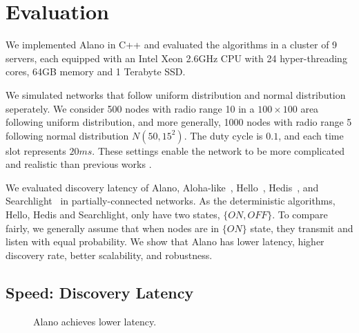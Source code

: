 \section{Evaluation}
\label{Evaluation}


We implemented Alano in C++ and evaluated the algorithms in a cluster of 9 servers, 
each equipped with an Intel Xeon 2.6GHz CPU with 24 hyper-threading cores, 64GB memory and 1 Terabyte SSD. 

We simulated networks that follow uniform distribution and normal distribution seperately. 
We consider 500 nodes with radio range 10 in a $100\times100$ area following uniform distribution, 
and more generally, 1000 nodes with radio range 5 following normal distribution $N(50, 15^2)$. 
The duty cycle is $0.1$, and each time slot represents $20ms$. 
These settings enable the network to be more complicated and realistic than previous works 
\cite{wang2015blinddate, qiu2016talk, sun2014hello, bakht2012searchlight, 
chen2015heterogeneous, kandhalu2010u, you2011aloha, 
mcglynn2001birthday, song2014probabilistic, vasudevan2009neighbor}.



We evaluated discovery latency of Alano, Aloha-like~\cite{you2011aloha}, Hello~\cite{sun2014hello}, Hedis~\cite{chen2015heterogeneous}, and Searchlight~\cite{bakht2012searchlight} in partially-connected networks. As the deterministic algorithms, Hello, Hedis and Searchlight, only have two states, $\{ON, OFF\}$. To compare fairly, we generally assume that when nodes are in $\{ON\}$ state, they transmit and listen with equal probability.
We show that Alano has lower latency, higher discovery rate, better scalability, and robustness.

\subsection{Speed: Discovery Latency}

\begin{figure}[!h]
\centering
{}
\hspace{0.01in}
\caption{Alano achieves lower latency.}
\label{fig_latency}
\end{figure}

